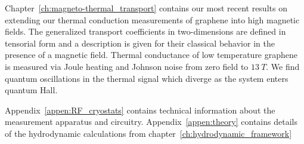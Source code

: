 Chapter~\ref{ch:magneto-thermal_transport} contains our most recent results on extending our thermal conduction measurements of graphene into high magnetic fields. The generalized transport coefficients in two-dimensions are defined in tensorial form and a description is given for their classical behavior in the presence of a magnetic field. Thermal conductance of low temperature graphene is measured via Joule heating and Johnson noise from zero field to $13~T$. We find quantum oscillations in the thermal signal which diverge as the system enters quantum Hall.

Appendix~\ref{appen:RF_cryostats} contains technical information about the measurement apparatus and circuitry. Appendix~\ref{appen:theory} contains details of the hydrodynamic calculations from chapter~\ref{ch:hydrodynamic_framework}
